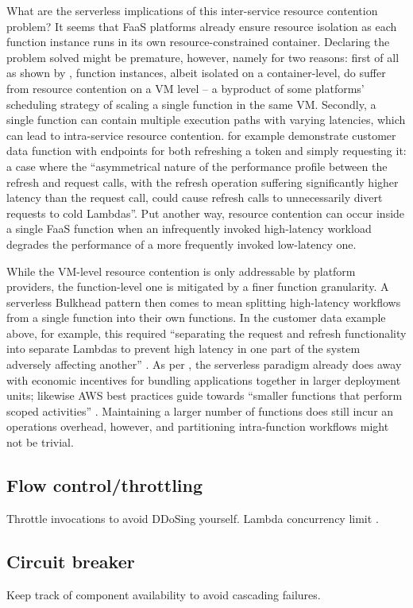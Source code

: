 What are the serverless implications of this inter-service resource contention problem? It seems that FaaS platforms already ensure resource isolation as each function instance runs in its own resource-constrained container. Declaring the problem solved might be premature, however, namely for two reasons: first of all as shown by \textcite{wang18peekingbehindcurtains}, function instances, albeit isolated on a container-level, do suffer from resource contention on a VM level -- a byproduct of some platforms' scheduling strategy of scaling a single function in the same VM. Secondly, a single function can contain multiple execution paths with varying latencies, which can lead to intra-service resource contention. \textcite{bardsley18optimizationStrategies} for example demonstrate customer data function with endpoints for both refreshing a token and simply requesting it: a case
where the ``asymmetrical nature of the performance profile between the refresh and request calls, with the refresh operation suffering significantly higher latency than the request call, could cause refresh calls to unnecessarily divert requests to cold Lambdas''. Put another way, resource contention can occur inside a single FaaS function when an infrequently invoked high-latency workload degrades the performance of a more frequently invoked low-latency one.

While the VM-level resource contention is only addressable by platform providers, the function-level one is mitigated by a finer function granularity. A serverless Bulkhead pattern then comes to mean splitting high-latency workflows from a single function into their own functions. In the customer data example above, for example, this required ``separating the request and refresh functionality into separate Lambdas to prevent high latency in one part of the system adversely affecting another'' \parencite{bardsley18optimizationStrategies}. As per \textcite{adzic2017serverless}, the serverless paradigm already does away with economic incentives for bundling applications together in larger deployment units; likewise AWS best practices guide towards ``smaller functions that perform scoped activities'' \parencite{aws18serverlessLens}. Maintaining a larger number of functions does still incur an operations overhead, however, and partitioning intra-function workflows might not be trivial.

\subsection{Flow control/throttling} \label{subsec:Flow control/throttling}

Throttle invocations to avoid DDoSing yourself. Lambda concurrency limit \textcite{aws18serverlessLens}.

\subsection{Circuit breaker} \label{subsec:Circuit breaker}

Keep track of component availability to avoid cascading failures.

